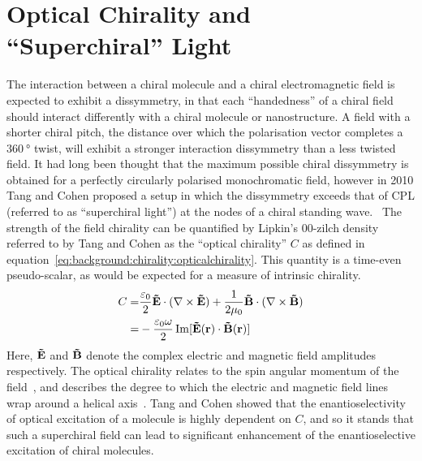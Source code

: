 \section{Optical Chirality and ``Superchiral'' Light}\label{sec:background:Chirality:opticalchirality}
The interaction between a chiral molecule and a chiral electromagnetic field is expected to exhibit a dissymmetry, in that each ``handedness'' of a chiral field should interact differently with a chiral molecule or nanostructure. A field with a shorter chiral pitch, the distance over which the polarisation vector completes a $\SI{360}{\degree}$ twist, will exhibit a stronger interaction dissymmetry than a less twisted field. It had long been thought that the maximum possible chiral dissymmetry is obtained for a perfectly circularly polarised monochromatic field, however in 2010 Tang and Cohen proposed a setup in which the dissymmetry exceeds that of CPL (referred to as ``superchiral light'') at the nodes of a chiral standing wave.~\cite{Tang2010}
The strength of the field chirality can be quantified by Lipkin's 00-zilch density~\cite{Lipkin1964} referred to by Tang and Cohen as the ``optical chirality'' $C$ as defined in equation~\ref{eq:background:chirality:opticalchirality}. This quantity is a time-even pseudo-scalar, as would be expected for a measure of intrinsic chirality.
\begin{equation} \label{eq:background:chirality:opticalchirality}
    \begin{split}
        C = &\frac{\varepsilon_0 }{2}{\bf{\tilde E}} \cdot (\nabla  \times {\bf{\tilde E}}) + \frac{1}{{2\mu _0}}{\bf{\tilde B}} \cdot (\nabla  \times {\bf{\tilde B}}) \\
        = &- \frac{{{\varepsilon _0}\omega }}{2} \operatorname{Im}[ \bf{\tilde E}(\bf{r}) \cdot \bf{\tilde B}(\bf{r}) ]
    \end{split}
\end{equation}
Here, $\bf{\tilde E}$ and $\bf{\tilde B}$ denote the complex electric and magnetic field amplitudes respectively. The optical chirality relates to the spin angular momentum of the field~\cite{Coles2012a}, and describes the degree to which the electric and magnetic field lines wrap around a helical axis~\cite{Tang2010, Tang2011}. Tang and Cohen showed that the enantioselectivity of optical excitation of a molecule is highly dependent on $C$, and so it stands that such a superchiral field can lead to significant enhancement of the enantioselective excitation of chiral molecules.

